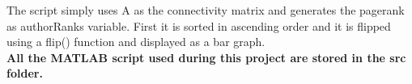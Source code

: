 \documentclass[unicode,11pt,a4paper,oneside,numbers=endperiod,openany]{scrartcl}
\begin{document}
{The script simply uses A as the connectivity matrix and generates the pagerank as authorRanks variable. First it is sorted in ascending order and it is flipped using a flip() function and displayed as a bar graph.}\\

\vspace{100px}
{\textbf{All the MATLAB script used during this project are stored in the src folder.}}
\end{document}
